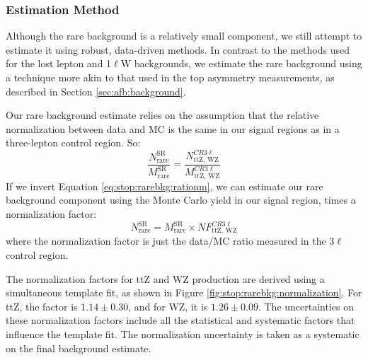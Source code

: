 \subsubsection{Estimation Method}
\label{sssec:stop:rarebkg:estimation}

Although the rare background is a relatively small component, we still
attempt to estimate it using robust, data-driven methods. In contrast
to the methods used for the lost lepton and 1$\ell$W backgrounds, we
estimate the rare background using a technique more akin to that used
in the top asymmetry measurements, as described in Section
\ref{sec:afb:background}.

Our rare background estimate relies on the assumption that the relative
normalization between data and MC is the same in our signal regions as
in a three-lepton control region. So:
\begin{equation}
\label{eq:stop:rarebkg:rationm}
\frac{N_\text{rare}^\text{SR}}{M_\text{rare}^\text{SR}} =
\frac{N_\text{ttZ, WZ}^{CR3\ell}}{M_\text{ttZ, WZ}^{CR3\ell}}
\end{equation}
If we invert Equation \ref{eq:stop:rarebkg:rationm}, we can estimate
our rare background component using the Monte Carlo yield in our
signal region, times a normalization factor:
\begin{equation}
\label{eq:stop:rarebkg:estimation}
N_\text{rare}^\text{SR} = M_\text{rare}^\text{SR} \times
NF_\text{ttZ, WZ}^{CR 3\ell}
\end{equation}
where the normalization factor is just the data/MC ratio measured in
the 3$\ell$ control region.

The normalization factors for ttZ and WZ production are derived using
a simultaneous template fit, as shown in Figure
\ref{fig:stop:rarebkg:normalization}. For ttZ, the factor is $1.14 \pm
0.30$, and for WZ, it is $1.26 \pm 0.09$. The uncertainties on these
normalization factors include all the statistical and systematic
factors that influence the template fit. The normalization uncertainty
is taken as a systematic on the final background estimate.

